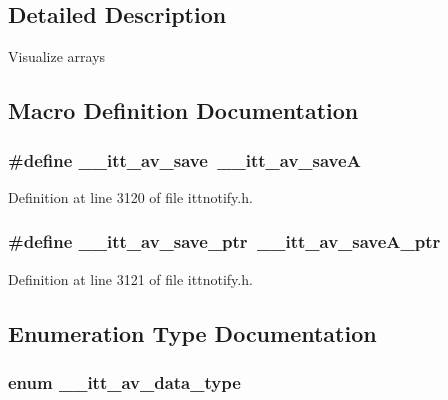 \subsection{Detailed Description}
Visualize arrays 

\subsection{Macro Definition Documentation}
\hypertarget{group__arrays_gaeb4215c9a934c515c6607dd9420e0413}{
\subsubsection[{\-\_\-\-\_\-itt\-\_\-av\-\_\-save}]{\setlength{\rightskip}{0pt plus 5cm}\#define \-\_\-\-\_\-itt\-\_\-av\-\_\-save~{\bf \-\_\-\-\_\-itt\-\_\-av\-\_\-save\-A}}}\label{group__arrays_gaeb4215c9a934c515c6607dd9420e0413}


Definition at line 3120 of file ittnotify.\-h.

\hypertarget{group__arrays_gab86c8591bc2869f08484d8a792d47b14}{
\subsubsection[{\-\_\-\-\_\-itt\-\_\-av\-\_\-save\-\_\-ptr}]{\setlength{\rightskip}{0pt plus 5cm}\#define \-\_\-\-\_\-itt\-\_\-av\-\_\-save\-\_\-ptr~\-\_\-\-\_\-itt\-\_\-av\-\_\-save\-A\-\_\-ptr}}\label{group__arrays_gab86c8591bc2869f08484d8a792d47b14}


Definition at line 3121 of file ittnotify.\-h.



\subsection{Enumeration Type Documentation}
\hypertarget{group__arrays_ga5bd7ba5314d3404b24bf164e87fb3635}{
\subsubsection[{\-\_\-\-\_\-itt\-\_\-av\-\_\-data\-\_\-type}]{\setlength{\rightskip}{0pt plus 5cm}enum {\bf \-\_\-\-\_\-itt\-\_\-av\-\_\-data\-\_\-type}}}\label{group__arrays_ga5bd7ba5314d3404b24bf164e87fb3635}


